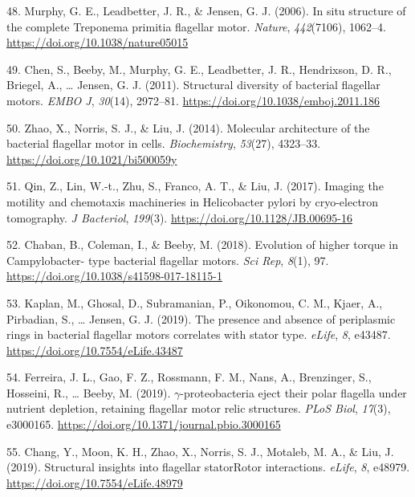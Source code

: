 \documentclass[]{tufte-book}
\begin{document}
\leavevmode\hypertarget{ref-murphy2006}{}%
48. Murphy, G. E., Leadbetter, J. R., \& Jensen, G. J. (2006). In situ structure of the complete Treponema primitia flagellar motor. \emph{Nature}, \emph{442}(7106), 1062--4. \url{https://doi.org/10.1038/nature05015}

\leavevmode\hypertarget{ref-chen2011}{}%
49. Chen, S., Beeby, M., Murphy, G. E., Leadbetter, J. R., Hendrixson, D. R., Briegel, A., \ldots{} Jensen, G. J. (2011). Structural diversity of bacterial flagellar motors. \emph{EMBO J}, \emph{30}(14), 2972--81. \url{https://doi.org/10.1038/emboj.2011.186}

\leavevmode\hypertarget{ref-zhao2014}{}%
50. Zhao, X., Norris, S. J., \& Liu, J. (2014). Molecular architecture of the bacterial flagellar motor in cells. \emph{Biochemistry}, \emph{53}(27), 4323--33. \url{https://doi.org/10.1021/bi500059y}

\leavevmode\hypertarget{ref-qin2017}{}%
51. Qin, Z., Lin, W.-t., Zhu, S., Franco, A. T., \& Liu, J. (2017). Imaging the motility and chemotaxis machineries in Helicobacter pylori by cryo-electron tomography. \emph{J Bacteriol}, \emph{199}(3). \url{https://doi.org/10.1128/JB.00695-16}

\leavevmode\hypertarget{ref-chaban2018}{}%
52. Chaban, B., Coleman, I., \& Beeby, M. (2018). Evolution of higher torque in Campylobacter- type bacterial flagellar motors. \emph{Sci Rep}, \emph{8}(1), 97. \url{https://doi.org/10.1038/s41598-017-18115-1}

\leavevmode\hypertarget{ref-kaplan2019}{}%
53. Kaplan, M., Ghosal, D., Subramanian, P., Oikonomou, C. M., Kjaer, A., Pirbadian, S., \ldots{} Jensen, G. J. (2019). The presence and absence of periplasmic rings in bacterial flagellar motors correlates with stator type. \emph{eLife}, \emph{8}, e43487. \url{https://doi.org/10.7554/eLife.43487}

\leavevmode\hypertarget{ref-ferreira2019}{}%
54. Ferreira, J. L., Gao, F. Z., Rossmann, F. M., Nans, A., Brenzinger, S., Hosseini, R., \ldots{} Beeby, M. (2019). \(\gamma\)-proteobacteria eject their polar flagella under nutrient depletion, retaining flagellar motor relic structures. \emph{PLoS Biol}, \emph{17}(3), e3000165. \url{https://doi.org/10.1371/journal.pbio.3000165}

\leavevmode\hypertarget{ref-chang2019}{}%
55. Chang, Y., Moon, K. H., Zhao, X., Norris, S. J., Motaleb, M. A., \& Liu, J. (2019). Structural insights into flagellar statorRotor interactions. \emph{eLife}, \emph{8}, e48979. \url{https://doi.org/10.7554/eLife.48979}
\end{document}
